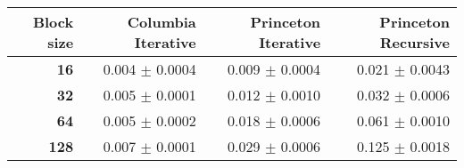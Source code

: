 \begin{tabular}{rrrr}\toprule
\textbf{Block size}  & \textbf{Columbia Iterative} & \textbf{Princeton Iterative} & \textbf{Princeton Recursive}\\\midrule
\textbf{16}  & 0.004 $\pm$ 0.0004 & 0.009 $\pm$ 0.0004 & 0.021 $\pm$ 0.0043\\
\textbf{32}  & 0.005 $\pm$ 0.0001 & 0.012 $\pm$ 0.0010 & 0.032 $\pm$ 0.0006\\
\textbf{64}  & 0.005 $\pm$ 0.0002 & 0.018 $\pm$ 0.0006 & 0.061 $\pm$ 0.0010\\
\textbf{128} & 0.007 $\pm$ 0.0001 & 0.029 $\pm$ 0.0006 & 0.125 $\pm$ 0.0018\\
\bottomrule
\end{tabular}
